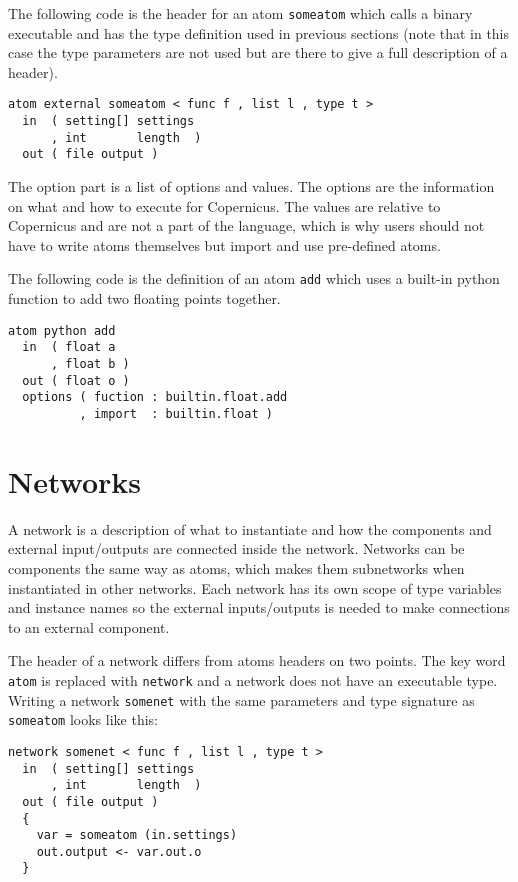 The following code is the header for an atom \verb#someatom# which
calls a binary executable and has the type definition used in previous
sections (note that in this case the type parameters are not used but
are there to give a full description of a header).

\begin{verbatim}
atom external someatom < func f , list l , type t >
  in  ( setting[] settings
      , int       length  )
  out ( file output )
\end{verbatim}

The option part is a list of options and values. The options are the
information on what and how to execute for Copernicus. The values are
relative to Copernicus and are not a part of the language, which is
why users should not have to write atoms themselves but import and use
pre-defined atoms.

The following code is the definition of an atom \verb#add# which uses
a built-in python function to add two floating points together.

\begin{verbatim}
atom python add
  in  ( float a
      , float b )
  out ( float o )
  options ( fuction : builtin.float.add
          , import  : builtin.float )
\end{verbatim}

\section{Networks}\label{sec:net}
A network is a description of what to instantiate and how the
components and external input/outputs are connected inside the
network. Networks can be components the same way as atoms, which makes
them subnetworks when instantiated in other networks. Each network has
its own scope of type variables and instance names so the external
inputs/outputs is needed to make connections to an external component.

The header of a network differs from atoms headers on two points. The
key word \verb#atom# is replaced with \verb#network# and a network
does not have an executable type. Writing a network \verb#somenet#
with the same parameters and type signature as \verb#someatom# looks
like this:

\begin{verbatim}
network somenet < func f , list l , type t >
  in  ( setting[] settings
      , int       length  )
  out ( file output )
  {
    var = someatom (in.settings)
    out.output <- var.out.o
  }
\end{verbatim}

